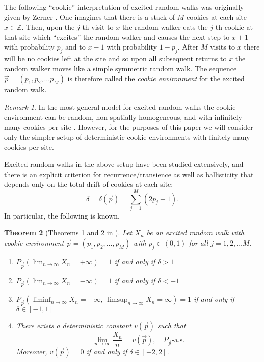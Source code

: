 \documentclass[reqno,letterpaper,11pt]{amsart}
\newtheorem{thm}{Theorem}[section]
\theoremstyle{remark}
\newtheorem{rem}[thm]{Remark}
\theoremstyle{definition}
\begin{document}
The following ``cookie'' interpretation of excited random walks was originally given by Zerner \cite{zMERW}. One imagines that there is a stack of $M$ cookies at each site $x \in {\mathbb Z}$. Then, upon the $j$-th visit to $x$ the random walker eats the $j$-th cookie at that site which ``excites'' the random walker and causes the next step to $x+1$ with probability $p_j$ and to $x-1$ with probability $1-p_j$. After $M$ visits to $x$ there will be no cookies left at the site and so upon all subsequent returns to $x$ the random walker moves like a simple symmetric random walk. The sequence $\vec{p} = (p_1,p_2,\ldots p_M)$ is therefore called the \emph{cookie environment} for the excited random walk.

\begin{rem}
 In the most general model for excited random walks the cookie environment can be random, non-spatially homogeneous, and with infinitely many cookies per site \cite{zMERW,kzPNERW}. However, for the purposes of this paper we will consider only the simpler setup of deterministic cookie environments with finitely many cookies per site. 
\end{rem}
 
Excited random walks in the above setup have been studied extensively, and there is an explicit criterion for recurrence/transience as well as ballisticity that depends only on the total drift of cookies at each site:
 \begin{equation}\label{ddef}
{\delta} = {\delta}(\vec{p}) = \sum_{j=1}^M (2 p_j - 1). 
\end{equation}
In particular, the following is known. 
\begin{thm}[Theorems 1 and 2 in \cite{kzPNERW}]\label{rtspeed}
Let $X_n$ be an excited random walk with cookie environment $\vec{p} = (p_1, p_2,\ldots, p_M)$ with $p_j \in (0,1)$ for all $j =1,2,\ldots M$. 
\begin{enumerate}
 \item $P_{\vec{p}}( \lim_{n{\rightarrow}\infty} X_n = +\infty) = 1$ if and only if ${\delta}> 1$ \label{transright}
 \item $P_{\vec{p}}( \lim_{n{\rightarrow}\infty} X_n = -\infty) = 1$ if and only if ${\delta}< -1$
 \item $P_{\vec{p}}( \liminf_{n{\rightarrow}\infty} X_n = -\infty, \,  \limsup_{n{\rightarrow}\infty} X_n = \infty) = 1$ if and only if ${\delta}\in [-1,1]$
 \item There exists a deterministic constant $v(\vec{p})$ such that 
\[
 \lim_{n{\rightarrow}\infty} \frac{X_n}{n} = v(\vec{p}), \quad P_{\vec{p}}\text{-a.s.}
\]
Moreover, $v(\vec{p}) = 0$ if and only if ${\delta} \in [-2,2]$. 
\end{enumerate}
\end{thm}
\end{document}
